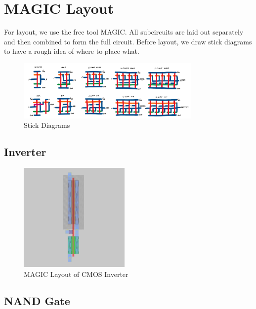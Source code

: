 \documentclass[conference]{IEEEtran}
\begin{document}
\section{MAGIC Layout}
For layout, we use the free tool MAGIC. All subcircuits are laid out separately and then combined to form the full circuit. Before layout, we draw stick diagrams to have a rough idea of where to place what.

\begin{figure}[t]
    \centering
    \includegraphics[width=0.8\textwidth]{images/stick_diagrams.png}
    \caption{Stick Diagrams}
\end{figure}

\subsection{Inverter}

\begin{figure}[H]
    \centering
    \includegraphics[width=0.48\textwidth]{images/inv_cmos_layout.png}
    \caption{MAGIC Layout of CMOS Inverter}
\end{figure}

\subsection{NAND Gate}
\end{document}
